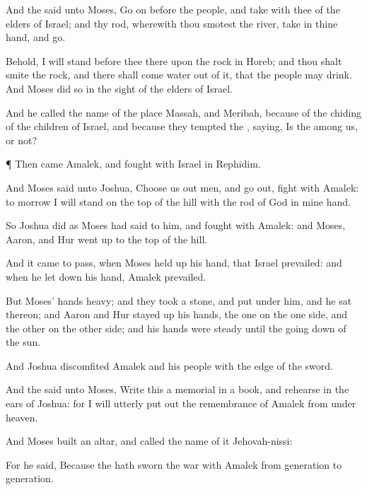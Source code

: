 {And the
{}
said unto
Moses, Go
on
before the
people, and
take with thee of the
elders of
Israel; and thy
rod, wherewith thou
smotest the
river,
take in thine
hand, and
go.

Behold, I will
stand
before thee there upon the
rock in
Horeb; and thou shalt
smite the
rock, and there shall
come
water out of it, that the
people may
drink. And
Moses
did so in the
sight of the
elders of
Israel.

And he
called the
name of the
place
Massah, and
Meribah, because of the
chiding of the
children of
Israel, and because they
tempted the
{},
saying,
Is the
{}
among us, or not?


\par }{\PP {}¶ Then
came
Amalek, and
fought with
Israel in
Rephidim.

And
Moses
said unto
Joshua, Choose us
out
men, and go
out,
fight with
Amalek: to
morrow I will
stand on the
top of the
hill with the
rod of
God in mine
hand.

So
Joshua
did as
Moses had
said to him, and
fought with
Amalek: and
Moses,
Aaron, and
Hur went
up to the
top of the
hill.

And it came to pass, when
Moses held
up his
hand, that
Israel
prevailed: and when he let
down his
hand,
Amalek
prevailed.

But
Moses’
hands
{}
heavy; and they
took a
stone, and
put
{} under him, and he
sat thereon; and
Aaron and
Hur stayed
up his
hands, the one on the one
side, and the other on the other
side; and his
hands were
steady until the going
down of the
sun.

And
Joshua
discomfited
Amalek and his
people with the
edge of the
sword.

And the
{}
said unto
Moses,
Write this
{} a
memorial in a
book, and
rehearse
{} in the
ears of
Joshua: for I will
utterly put
out the
remembrance of
Amalek from under
heaven.

And
Moses
built an
altar, and
called the
name of it
Jehovah-nissi:

For he
said, Because the
{} hath
sworn
{} the
{}
{}
war with
Amalek from
generation to
generation.




}
